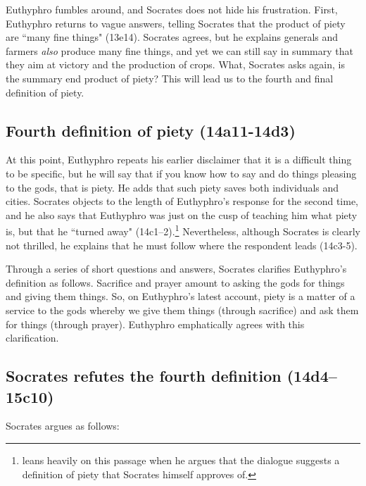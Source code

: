 \documentclass[11pt]{article}
\begin{document}
Euthyphro fumbles around, and Socrates does not hide his frustration.
First, Euthyphro returns to vague answers, telling Socrates that the
product of piety are ``many fine things" (13e14).  Socrates agrees, but he
explains generals and farmers \emph{also} produce many fine things, and yet
we can still say in summary that they aim at victory and the production of
crops.  What, Socrates asks again, is the summary end product of piety?
This will lead us to the fourth and final definition of piety.


\subsection{Fourth definition of piety (14a11-14d3)}

At this point, Euthyphro repeats his earlier disclaimer that it is
a difficult thing to be specific, but he will say that if you know how to
say and do things pleasing to the gods, that is piety.  He adds that such
piety saves both individuals and cities.  Socrates objects to the length of
Euthyphro's response for the second time, and he also says that Euthyphro
was just on the cusp of teaching him what piety is, but that he ``turned
away" (14c1--2).\footnote{\citet{mcpherran1992} leans heavily on this
passage when he argues that the dialogue suggests a definition of piety
that Socrates himself approves of.}  Nevertheless, although Socrates is
clearly not thrilled, he explains that he must follow where the respondent
leads (14c3-5).

Through a series of short questions and answers, Socrates clarifies
Euthyphro's definition as follows.  Sacrifice and prayer amount to asking
the gods for things and giving them things.  So, on Euthyphro's latest
account, piety is a matter of a service to the gods whereby we give them
things (through sacrifice) and ask them for things (through prayer).
Euthyphro emphatically agrees with this clarification.


\subsection{Socrates refutes the fourth definition (14d4--15c10)}

Socrates argues as follows:
\end{document}
